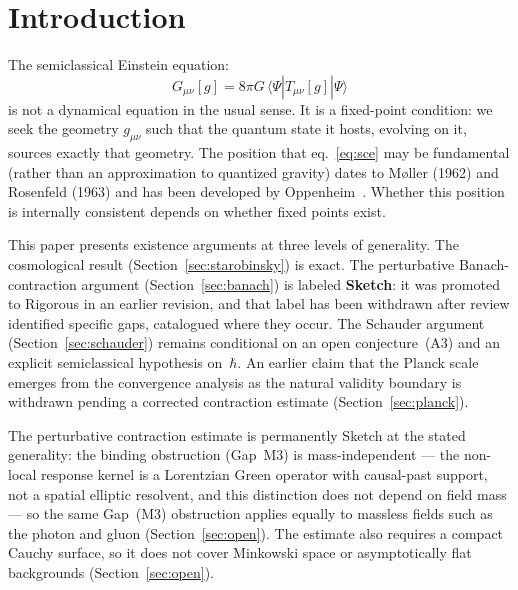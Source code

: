 \documentclass[12pt,a4paper]{article}
\begin{document}
\section{Introduction}

The semiclassical Einstein equation:
\begin{equation}
G_{\mu\nu}[g] = 8\pi G\,\langle\Psi|\hat{T}_{\mu\nu}[g]|\Psi\rangle
\label{eq:sce}
\end{equation}
is not a dynamical equation in the usual sense. It is a fixed-point condition: we seek the
geometry $g_{\mu\nu}$ such that the quantum state it hosts, evolving on it, sources exactly
that geometry. The position that eq.~\eqref{eq:sce} may be fundamental (rather than an
approximation to quantized gravity) dates to M\o ller (1962) and Rosenfeld (1963) and has
been developed by Oppenheim~\cite{oppenheim}. Whether this position is internally
consistent depends on whether fixed points exist.

This paper presents existence arguments at three levels of generality. The cosmological
result (Section~\ref{sec:starobinsky}) is exact. The perturbative Banach-contraction
argument (Section~\ref{sec:banach}) is labeled \textbf{Sketch}: it was promoted to
Rigorous in an earlier revision, and that label has been withdrawn after review identified
specific gaps, catalogued where they occur. The Schauder argument
(Section~\ref{sec:schauder}) remains conditional on an open conjecture~(A3) and
an explicit semiclassical hypothesis on~$\hbar$. An earlier claim that the Planck scale
emerges from the convergence analysis as the natural validity boundary is withdrawn
pending a corrected contraction estimate (Section~\ref{sec:planck}).

\medskip\noindent The perturbative contraction estimate is permanently Sketch at the stated generality: the binding obstruction (Gap~M3) is mass-independent --- the non-local response kernel is a Lorentzian Green operator with causal-past support, not a spatial elliptic resolvent, and this distinction does not depend on field mass --- so the same Gap~(M3) obstruction applies equally to massless fields such as the photon and gluon (Section~\ref{sec:open}). The estimate also requires a compact Cauchy surface, so it does not cover Minkowski space or asymptotically flat backgrounds (Section~\ref{sec:open}).

\end{document}
